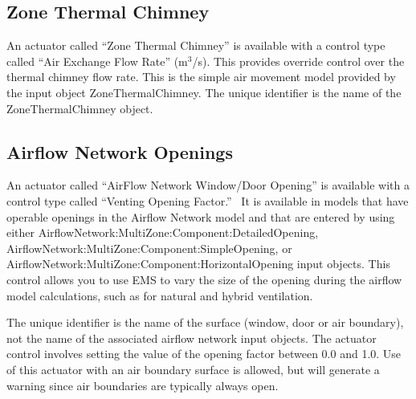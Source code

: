 \subsection{Zone Thermal Chimney}\label{zone-thermal-chimney}

An actuator called ``Zone Thermal Chimney'' is available with a control type called ``Air Exchange Flow Rate'' (m\(^{3}\)/s). This provides override control over the thermal chimney flow rate. This is the simple air movement model provided by the input object ZoneThermalChimney. The unique identifier is the name of the ZoneThermalChimney object.

\subsection{Airflow Network Openings}\label{airflow-network-openings}

An actuator called ``AirFlow Network Window/Door Opening'' is available with a control type called ``Venting Opening Factor.''~ It is available in models that have operable openings in the Airflow Network model and that are entered by using either AirflowNetwork:MultiZone:Component:DetailedOpening, AirflowNetwork:MultiZone:Component:SimpleOpening, or AirflowNetwork:MultiZone:Component:HorizontalOpening input objects. This control allows you to use EMS to vary the size of the opening during the airflow model calculations, such as for natural and hybrid ventilation.

The unique identifier is the name of the surface (window, door or air boundary), not the name of the associated airflow network input objects. The actuator control involves setting the value of the opening factor between 0.0 and 1.0. Use of this actuator with an air boundary surface is allowed, but will generate a warning since air boundaries are typically always open.
